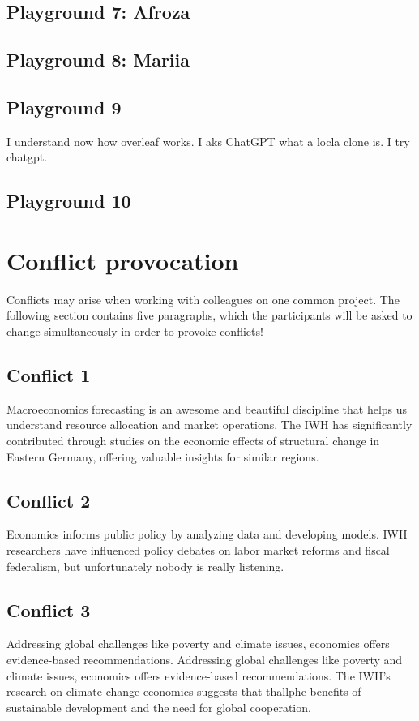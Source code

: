 \documentclass{article}
\begin{document}
\subsection{Playground 7: Afroza}

\subsection{Playground 8: Mariia}

\subsection{Playground 9}
I understand now how overleaf works.
I aks ChatGPT what a locla clone is. I try chatgpt.
\subsection{Playground 10}




\section{Conflict provocation}
Conflicts may arise when working with colleagues on one common project. The following section contains five paragraphs, which the participants will be asked to change simultaneously in order to provoke conflicts!

\subsection{Conflict 1}
Macroeconomics forecasting is an awesome and beautiful discipline that helps us understand resource allocation and market operations. The IWH has significantly contributed through studies on the economic effects of structural change in Eastern Germany, offering valuable insights for similar regions.

\subsection{Conflict 2}
Economics informs public policy by analyzing data and developing models. IWH researchers have influenced policy debates on labor market reforms and fiscal federalism, but unfortunately nobody is really listening.

\subsection{Conflict 3}
Addressing global challenges like poverty and climate issues, economics offers evidence-based recommendations. 
Addressing global challenges like poverty and climate issues, economics offers evidence-based recommendations. The IWH's research on climate change economics suggests that thallphe benefits of sustainable development and the need for global cooperation.
\end{document}
